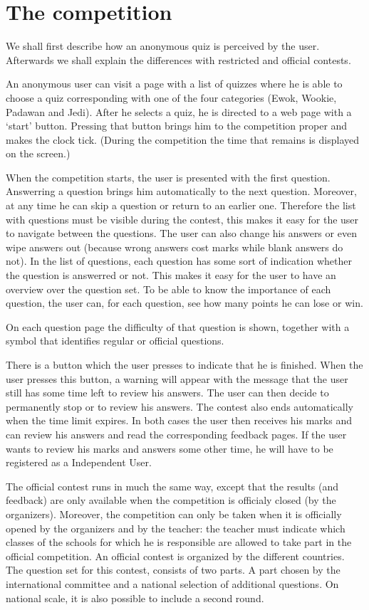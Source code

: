 \section{The competition}

We shall first describe how an anonymous quiz is perceived by the user. Afterwards we shall explain 
the differences with restricted and official contests.

An anonymous user can visit a page with a list of quizzes where he is able to choose a quiz corresponding 
with one of the four categories (Ewok, Wookie, Padawan and Jedi). After he selects a quiz, he is directed to a web page with a `start' button. Pressing that button 
brings him to the competition proper and makes the clock tick. (During the competition the time that remains
is displayed on the screen.) 

When the competition starts, the user is presented with the first question. Answerring a question brings
him automatically to the next question. Moreover, at any time he can skip a question or return to an earlier 
one. Therefore the list with questions must be visible during the contest, this makes it easy for the user
to navigate between the questions. The user can also change his answers or even wipe answers out (because 
wrong answers cost marks while blank answers do not). In the list of questions, each question has some 
sort of indication whether the question is answerred or not. This makes it easy for the user to have an
overview over the question set. To be able to know the importance of each question, the user can, for each
question, see how many points he can lose or win. 

On each question page the difficulty of that question is shown, together with a symbol that identifies
regular or official questions.

There is a button which the user presses to indicate that he is finished. When the user presses this 
button, a warning will appear with the message that the user still has some time left to review his
answers. The user can then decide to permanently stop or to review his answers. The contest also ends
automatically when the time limit expires. In both cases the user then receives his marks and can review his
answers and read the corresponding feedback pages. If the user wants to review his marks and answers some 
other time, he will have to be registered as a Independent User. 

The official contest runs in much the same way, except that the results (and feedback) are only available
when the competition is officialy closed (by the organizers). Moreover, the competition can only be taken
when it is officially opened by the organizers and by the teacher: the teacher must indicate which classes
of the schools for which he is responsible are allowed to take part in the official competition. An official
contest is organized by the different countries. The question set for this contest, consists of two parts. 
A part chosen by the international committee and a national selection of additional questions. On national 
scale, it is also possible to include a second round. 

